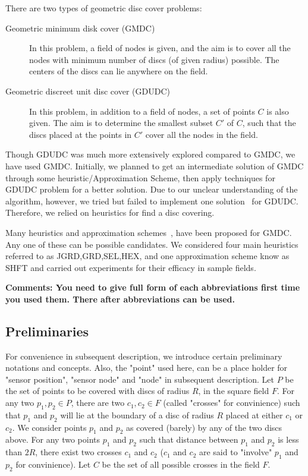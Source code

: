 There are two types of geometric disc cover problems:

\begin{description}
\item[Geometric minimum disk cover (GMDC)] In this problem, a field of nodes is given, and the aim is to cover all the nodes with minimum number of discs (of given radius) possible. The centers of the discs can lie anywhere on the field.
\item[Geometric discreet unit disc cover (GDUDC)] In this problem, in addition to a field of nodes, a set of points $C$ is also given. The aim is to determine the smallest subset $C'$ of $C$, such that the discs placed at the points in $C'$ cover all the nodes in the field.
\end{description}

Though GDUDC was much more extensively explored compared to GMDC, we have 
used GMDC. Initially, we planned to get an intermediate solution of GMDC through some heuristic/Approximation Scheme, then apply techniques for GDUDC problem for a better solution. Due to our unclear understanding of the algorithm, however, we tried but failed to implement one solution~\cite{carmi} for GDUDC. Therefore, we relied on heuristics for find a disc covering.

Many heuristics and approximation schemes~\cite{shifting}, \cite{appScheme} have been proposed for GMDC. Any one of these can be possible candidates. We considered four main heuristics referred to as JGRD,GRD,SEL,HEX, and one approximation scheme know as SHFT and carried out experiments for their efficacy in sample fields. 

{\bf Comments: You need to give full form of each abbreviations first time you used them. There after abbreviations can be used.}

\subsection{Preliminaries}\label{subsec:prelim}

For convenience in subsequent description, we introduce certain preliminary
notations and concepts. Also, the "point" used here, can be a place holder for "sensor position", "sensor node" and "node" in subsequent description. Let $P$ be the set of points to be covered with discs of radius $R$, in the square field $F$. For any two $p_1, p_2 \in P$, there are two $c_1,c_2 \in F$ (called "crosses" for convinience) such that $p_1$ and $p_2$ will lie at the boundary of a disc of radius $R$ placed at either $c_1$ or $c_2$. We consider points $p_1$ and $p_2$ as covered (barely) by any of the two discs above. For any two points $p_1$ and $p_2$ such that distance between $p_1$ and $p_2$ is less than $2R$, there exist two crosses $c_1$ and $c_2$ ($c_1$ and $c_2$ are said to "involve" $p_1$ and $p_2$ for convinience). Let $C$ be the set of all possible crosses in the field $F$.

